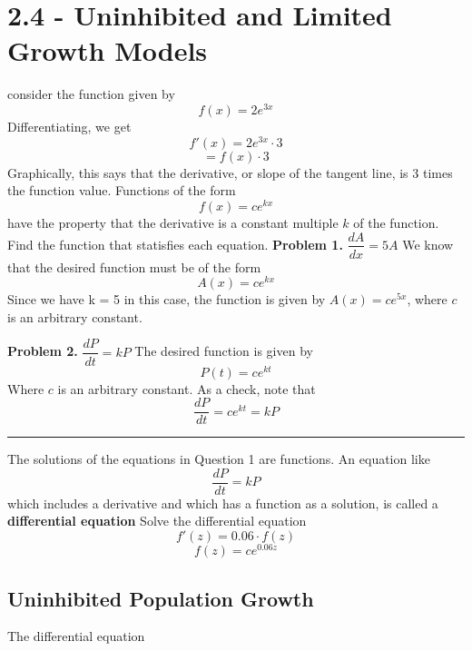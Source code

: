 \documentclass{report}
\begin{document}
\section*{2.4 - Uninhibited and Limited Growth Models}
consider the function given by
$$ f(x) = 2e^{3x}$$
Differentiating, we get
$$ f'(x) = 2e^{3x} \cdot 3$$
$$ = f(x) \cdot 3$$
\bigbreak \noindent
Graphically, this says that the derivative, or slope of the tangent line, is 3 times the function value.
\bigbreak \noindent
Functions of the form 
$$f(x) = ce^{kx}$$
have the property that the derivative is a constant multiple $k$ of the function.
\bigbreak \noindent
{}
\q
Find the function that statisfies each equation.
\bigbreak \noindent
\textbf{Problem 1.} $ \dfrac{dA}{dx} = 5A$
\bigbreak \noindent
We know that the desired function must be of the form
$$ A(x) = ce^{kx}$$
Since we have k = 5 in this case, the function is given by $A(x) = ce^{5x}$, where $c$ is an arbitrary constant.

\pagebreak
\noindent\textbf{Problem 2.} $\dfrac{dP}{dt} = kP$
\bigbreak \noindent
The desired function is given by
$$ P(t) = ce^{kt}$$
Where $c$ is an arbitrary constant. As a check, note that
$$ \dfrac{dP}{dt} = ce^{kt} = kP$$
\bigbreak \noindent
\hrule
\bigbreak \noindent
The solutions of the equations in Question 1 are functions. An equation like
$$ \dfrac{dP}{dt} = kP$$
which includes a derivative and which has a function as a solution, is called a \textbf{differential equation}
\bigbreak \noindent
\q
Solve the differential equation
$$ f'(z) = 0.06 \cdot f(z)$$
\sol
$$ f(z) = ce^{0.06z}$$

\bigbreak \noindent
\subsection*{Uninhibited Population Growth}
The differential equation
\end{document}
